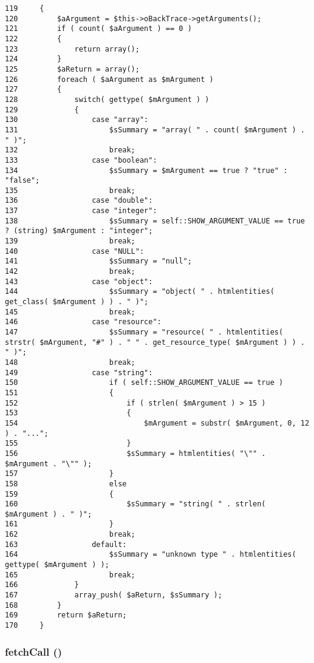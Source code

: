 \begin{Code}\begin{verbatim}119     {
120         $aArgument = $this->oBackTrace->getArguments();
121         if ( count( $aArgument ) == 0 )
122         {
123             return array();
124         }
125         $aReturn = array();
126         foreach ( $aArgument as $mArgument )
127         {
128             switch( gettype( $mArgument ) )
129             {
130                 case "array":
131                     $sSummary = "array( " . count( $mArgument ) . " )";
132                     break;
133                 case "boolean":
134                     $sSummary = $mArgument == true ? "true" : "false";
135                     break;
136                 case "double":
137                 case "integer":
138                     $sSummary = self::SHOW_ARGUMENT_VALUE == true ? (string) $mArgument : "integer";
139                     break;
140                 case "NULL":
141                     $sSummary = "null";
142                     break;
143                 case "object":
144                     $sSummary = "object( " . htmlentities( get_class( $mArgument ) ) . " )";
145                     break;
146                 case "resource":
147                     $sSummary = "resource( " . htmlentities( strstr( $mArgument, "#" ) . " " . get_resource_type( $mArgument ) ) . " )";
148                     break;
149                 case "string":
150                     if ( self::SHOW_ARGUMENT_VALUE == true )
151                     {
152                         if ( strlen( $mArgument ) > 15 )
153                         {
154                             $mArgument = substr( $mArgument, 0, 12 ) . "...";
155                         }
156                         $sSummary = htmlentities( "\"" . $mArgument . "\"" );
157                     }
158                     else
159                     {
160                         $sSummary = "string( " . strlen( $mArgument ) . " )";
161                     }
162                     break;
163                 default:
164                     $sSummary = "unknown type " . htmlentities( gettype( $mArgument ) );
165                     break;
166             }
167             array_push( $aReturn, $sSummary );
168         }
169         return $aReturn;
170     }
\end{verbatim}
\end{Code}


\hypertarget{class_back_trace_explain_5a465523eda7c24e3dcef8d111aae02d}{
\subsubsection[{fetchCall}]{\setlength{\rightskip}{0pt plus 5cm}fetchCall ()}}
\label{class_back_trace_explain_5a465523eda7c24e3dcef8d111aae02d}



